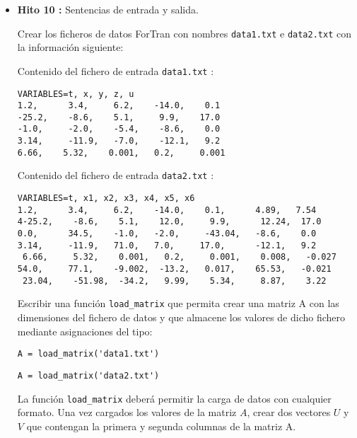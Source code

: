 \documentclass[12pt,spanish]{article}
\begin{document}
\begin{itemize}
\newpage 

\item {\bf Hito 10 :}   Sentencias de entrada y salida.

\vspace{0.5cm}    

Crear los ficheros de datos ForTran con nombres  \verb|data1.txt| e 
\verb|data2.txt| con la información siguiente:

\vspace{1cm}

Contenido del fichero de entrada \verb|data1.txt| :

\begin{verbatim}
VARIABLES=t, x, y, z, u
1.2,      3.4,     6.2,    -14.0,    0.1
-25.2,    -8.6,    5.1,     9.9,    17.0
-1.0,     -2.0,    -5.4,    -8.6,    0.0
3.14,     -11.9,   -7.0,    -12.1,   9.2
6.66,    5.32,    0.001,   0.2,     0.001
\end{verbatim}

\vspace{1cm}

Contenido del fichero de entrada \verb|data2.txt| :

\begin{verbatim}
VARIABLES=t, x1, x2, x3, x4, x5, x6
1.2,      3.4,     6.2,    -14.0,    0.1,      4.89,   7.54
4-25.2,    -8.6,    5.1,    12.0,     9.9,      12.24,  17.0
0.0,      34.5,    -1.0,   -2.0,     -43.04,   -8.6,    0.0
3.14,     -11.9,   71.0,   7.0,     17.0,      -12.1,   9.2
 6.66,     5.32,    0.001,   0.2,     0.001,    0.008,   -0.027
54.0,     77.1,    -9.002,  -13.2,   0.017,    65.53,   -0.021
 23.04,    -51.98,  -34.2,   9.99,    5.34,     8.87,    3.22 
\end{verbatim}

\vspace{0.5cm}


Escribir una función \verb|load_matrix| que permita crear una matriz A con las dimensiones 
del fichero de datos y que almacene los valores de dicho fichero mediante 
 asignaciones del tipo: 
 
 \hspace{2cm} \verb|A = load_matrix('data1.txt')| 
 
 \hspace{2cm}  \verb|A = load_matrix('data2.txt')|

La función   \verb|load_matrix| deberá permitir la carga de datos con cualquier formato. 
Una vez cargados los valores de la matriz $ A $, crear dos vectores $ U$ y $V$  que contengan la primera y segunda columnas de la matriz A. 
     


\end{itemize}
\end{document}
